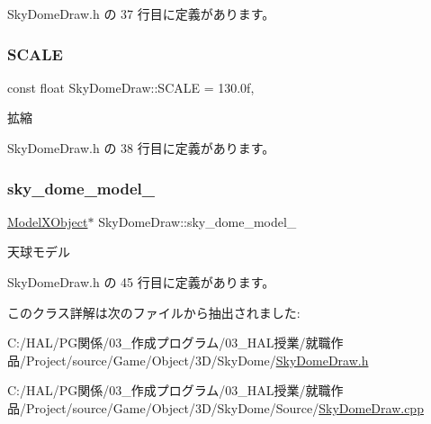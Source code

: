  Sky\+Dome\+Draw.\+h の 37 行目に定義があります。

\mbox{\label{class_sky_dome_draw_a50389a4bcc210ebd4b2ca93a161ecae6}} 
\subsubsection{\texorpdfstring{S\+C\+A\+LE}{SCALE}}
{\footnotesize\ttfamily const float Sky\+Dome\+Draw\+::\+S\+C\+A\+LE = 130.\+0f\hspace{0.3cm}{\ttfamily [static]}, {\ttfamily [private]}}



拡縮 



 Sky\+Dome\+Draw.\+h の 38 行目に定義があります。

\mbox{\label{class_sky_dome_draw_a2453fb04f979443c61acc10eafa183aa}} 
\subsubsection{\texorpdfstring{sky\+\_\+dome\+\_\+model\+\_\+}{sky\_dome\_model\_}}
{\footnotesize\ttfamily \mbox{\hyperlink{class_model_x_object}{Model\+X\+Object}}$\ast$ Sky\+Dome\+Draw\+::sky\+\_\+dome\+\_\+model\+\_\+\hspace{0.3cm}{\ttfamily [private]}}



天球モデル 



 Sky\+Dome\+Draw.\+h の 45 行目に定義があります。



このクラス詳解は次のファイルから抽出されました\+:\begin{DoxyCompactItemize}
\item 
C\+:/\+H\+A\+L/\+P\+G関係/03\+\_\+作成プログラム/03\+\_\+\+H\+A\+L授業/就職作品/\+Project/source/\+Game/\+Object/3\+D/\+Sky\+Dome/\mbox{\hyperlink{_sky_dome_draw_8h}{Sky\+Dome\+Draw.\+h}}\item 
C\+:/\+H\+A\+L/\+P\+G関係/03\+\_\+作成プログラム/03\+\_\+\+H\+A\+L授業/就職作品/\+Project/source/\+Game/\+Object/3\+D/\+Sky\+Dome/\+Source/\mbox{\hyperlink{_sky_dome_draw_8cpp}{Sky\+Dome\+Draw.\+cpp}}\end{DoxyCompactItemize}
